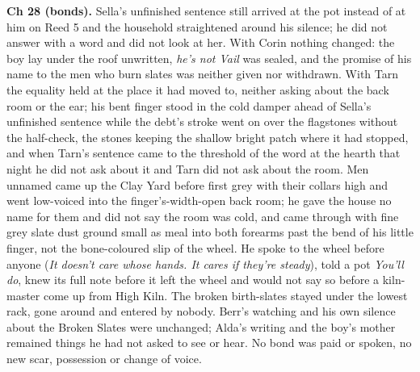 \documentclass{design/chronicle}
\begin{document}
{\textbf{Ch 28 (bonds).} Sella’s unfinished sentence still arrived at the pot instead of at him on Reed 5 and the household straightened around his silence; he did not answer with a word and did not look at her. With Corin nothing changed: the boy lay under the roof unwritten, \emph{he’s not Vail} was sealed, and the promise of his name to the men who burn slates was neither given nor withdrawn. With Tarn the equality held at the place it had moved to, neither asking about the back room or the ear; his bent finger stood in the cold damper ahead of Sella’s unfinished sentence while the debt’s stroke went on over the flagstones without the half-check, the stones keeping the shallow bright patch where it had stopped, and when Tarn’s sentence came to the threshold of the word at the hearth that night he did not ask about it and Tarn did not ask about the room. Men unnamed came up the Clay Yard before first grey with their collars high and went low-voiced into the finger’s-width-open back room; he gave the house no name for them and did not say the room was cold, and came through with fine grey slate dust ground small as meal into both forearms past the bend of his little finger, not the bone-coloured slip of the wheel. He spoke to the wheel before anyone (\emph{It doesn’t care whose hands. It cares if they’re steady}), told a pot \emph{You’ll do}, knew its full note before it left the wheel and would not say so before a kiln-master come up from High Kiln. The broken birth-slates stayed under the lowest rack, gone around and entered by nobody. Berr’s watching and his own silence about the Broken Slates were unchanged; Alda’s writing and the boy’s mother remained things he had not asked to see or hear. No bond was paid or spoken, no new scar, possession or change of voice.

}
\end{document}

